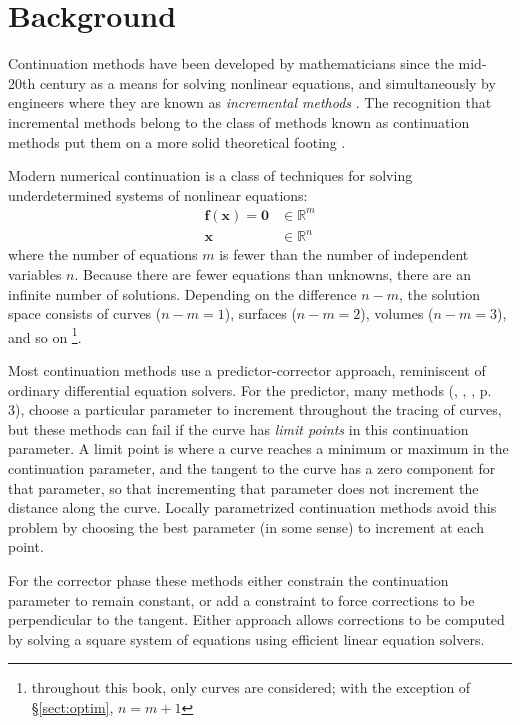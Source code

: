 \documentclass[10pt,openany,twoside]{book}
\numberwithin{equation}{section}   %
\newcommand{\Newterm}[1]{{\em #1}}
\newcommand{\Vector}[1]{\boldsymbol{#1}}
\newcommand{\Sectref}[1]{\S\ref{#1}}
\begin{document}
\section{Background}\label{sect:background}
Continuation methods have been developed by mathematicians since the
mid-20th century as a means for solving nonlinear equations,
and simultaneously by engineers where they are known as \emph{incremental methods}
\cite{oden2006finite}.
The recognition that incremental methods belong to the class of methods
known as continuation methods put them on a more solid theoretical footing
\cite{rheinboldt1981numerical}.

Modern numerical continuation is a class of techniques for solving
underdetermined systems of nonlinear equations:
\begin{align}\label{eqn:fx}
\Vector{f}(\Vector{x}) = \Vector{0} & \in \mathbb{R}^{m} \nonumber \\
\Vector{x} & \in \mathbb{R}^{n}
\end{align}
where the number of equations $m$
is fewer than the number of independent variables $n$.
Because there are fewer equations than unknowns, there are an infinite
number of solutions.
Depending on the difference $n-m$, the solution space consists of
curves ($n-m = 1$), surfaces ($n-m = 2$), volumes ($n-m = 3$), and so on
\footnote{throughout this book, only curves are considered; with the
exception of \Sectref{sect:optim}, $n = m+1$}.

Most continuation methods use a predictor-corrector approach,
reminiscent of ordinary differential equation solvers.
For the predictor, many methods
(\cite{cardani1978continuation}, \cite{yu2020nonlinear},
\cite{rheinboldt1983algorithm},
\cite{allgower1990numerical} p. 3),
choose a particular parameter to increment throughout the tracing of curves,
but these methods can fail if the curve has \Newterm{limit points} in
this continuation parameter.
A limit point is where a curve reaches a minimum or maximum in the continuation
parameter, and the tangent to the curve has a zero component for that parameter,
so that incrementing that parameter does not increment the distance along the
curve. Locally parametrized continuation methods \cite{rheinboldt1983locally}
avoid this problem
by choosing the best parameter (in some sense) to increment at each point.

For the corrector phase these methods either constrain the continuation parameter
to remain constant, or add a constraint to force corrections to be perpendicular to
the tangent. Either approach allows corrections to be computed by solving a
square system of equations using efficient linear equation solvers.
\end{document}
